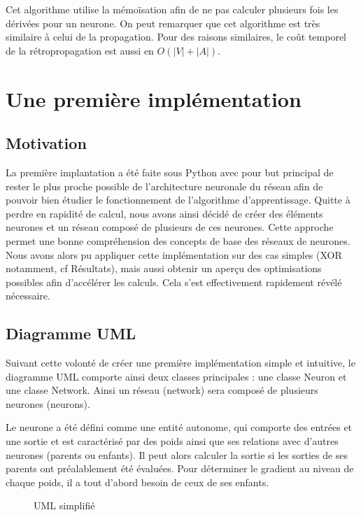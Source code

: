 \documentclass{report}
\begin{document}
Cet algorithme utilise la mémoïsation afin de ne pas calculer plusieurs fois les dérivées pour un neurone. On peut remarquer que cet algorithme est très similaire à celui de la propagation. Pour des raisons similaires, le coût temporel de la rétropropagation est aussi en $O(|V|+|A|)$.

\chapter{Une première implémentation}

\section{Motivation}

La première implantation a été faite sous Python avec pour but principal de rester le plus proche possible de l'architecture neuronale du réseau afin de pouvoir bien étudier le fonctionnement de l'algorithme d'apprentissage. Quitte à perdre en rapidité de calcul, nous avons ainsi décidé de créer des éléments neurones et un réseau composé de plusieurs de ces neurones. Cette approche permet une bonne compréhension des concepts de base des réseaux de neurones. Nous avons alors pu appliquer cette implémentation sur des cas simples (XOR notamment, cf Résultats), mais aussi obtenir un aperçu des optimisations possibles afin d'accélérer les calculs. Cela s'est effectivement rapidement révélé nécessaire.  

\section{Diagramme UML}

Suivant cette volonté de créer une première implémentation simple et intuitive, le diagramme UML comporte ainsi deux classes principales : une classe Neuron et une classe Network. Ainsi un réseau (network) sera composé de plusieurs neurones (neurons).

Le neurone a été défini comme une entité autonome, qui comporte des entrées et une sortie et est caractérisé par des poids ainsi que ses relations avec d'autres neurones (parents ou enfants). Il peut alors calculer la sortie si les sorties de ses parents ont préalablement été évaluées. Pour déterminer le gradient au niveau de chaque poids, il a tout d'abord besoin de ceux de ses enfants.


\begin{figure}
\begin{center}

\caption{UML simplifié}
\label{UML simplifié}
\end{center}
\end{figure}
\end{document}
